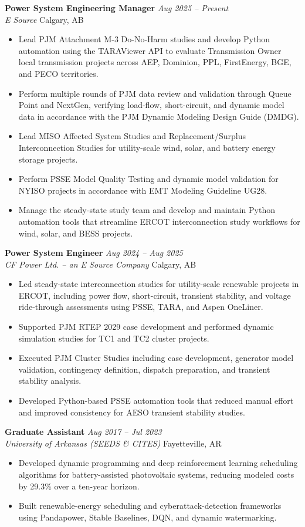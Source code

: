 \documentclass[10pt,letterpaper]{article}
\newcommand{\role}[4]{%
  \textbf{#1} \hfill \textit{#2}\\
  \textit{#3} \hfill #4\vspace{-2pt}
}
\begin{document}
\role{Power System Engineering Manager}{Aug 2025 -- Present}{E Source}{Calgary, AB}
\begin{itemize}
  \item Lead PJM Attachment M-3 Do-No-Harm studies and develop Python automation using the TARAViewer API to evaluate Transmission Owner local transmission projects across AEP, Dominion, PPL, FirstEnergy, BGE, and PECO territories.
  \item Perform multiple rounds of PJM data review and validation through Queue Point and NextGen, verifying load-flow, short-circuit, and dynamic model data in accordance with the PJM Dynamic Modeling Design Guide (DMDG).
  \item Lead MISO Affected System Studies and Replacement/Surplus Interconnection Studies for utility-scale wind, solar, and battery energy storage projects.
  \item Perform PSS\textregistered{}E Model Quality Testing and dynamic model validation for NYISO projects in accordance with EMT Modeling Guideline UG28.
  \item Manage the steady-state study team and develop and maintain Python automation tools that streamline ERCOT interconnection study workflows for wind, solar, and BESS projects.
\end{itemize}

\role{Power System Engineer}{Aug 2024 -- Aug 2025}{CF Power Ltd. -- an E Source Company}{Calgary, AB}
\begin{itemize}
  \item Led steady-state interconnection studies for utility-scale renewable projects in ERCOT, including power flow, short-circuit, transient stability, and voltage ride-through assessments using PSS\textregistered{}E, TARA, and Aspen OneLiner.
  \item Supported PJM RTEP 2029 case development and performed dynamic simulation studies for TC1 and TC2 cluster projects.
  \item Executed PJM Cluster Studies including case development, generator model validation, contingency definition, dispatch preparation, and transient stability analysis.
  \item Developed Python-based PSS\textregistered{}E automation tools that reduced manual effort and improved consistency for AESO transient stability studies.
\end{itemize}

\role{Graduate Assistant}{Aug 2017 -- Jul 2023}{University of Arkansas (SEEDS \& CITES)}{Fayetteville, AR}
\begin{itemize}
  \item Developed dynamic programming and deep reinforcement learning scheduling algorithms for battery-assisted photovoltaic systems, reducing modeled costs by 29.3\% over a ten-year horizon.
  \item Built renewable-energy scheduling and cyberattack-detection frameworks using Pandapower, Stable Baselines, DQN, and dynamic watermarking.
\end{itemize}
\end{document}
